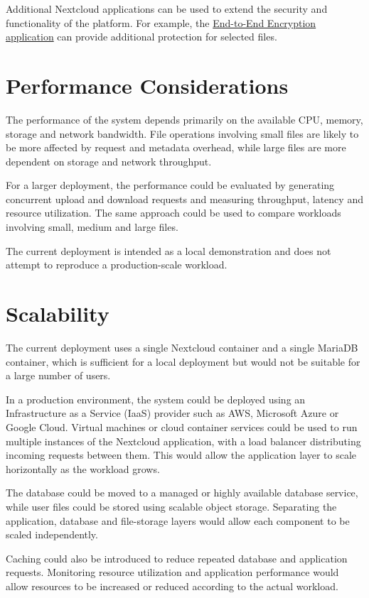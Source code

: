 \documentclass[a4paper]{article}
\begin{document}
Additional Nextcloud applications can be used to extend the security
and functionality of the platform. For example, the
\href{https://apps.nextcloud.com/apps/end_to_end_encryption}{End-to-End
Encryption application} can provide additional protection for
selected files.

\section{Performance Considerations}

The performance of the system depends primarily on the available CPU,
memory, storage and network bandwidth. File operations involving small
files are likely to be more affected by request and metadata overhead,
while large files are more dependent on storage and network throughput.

For a larger deployment, the performance could be evaluated by
generating concurrent upload and download requests and measuring
throughput, latency and resource utilization. The same approach could
be used to compare workloads involving small, medium and large files.

The current deployment is intended as a local demonstration and does
not attempt to reproduce a production-scale workload.

\section{Scalability}

The current deployment uses a single Nextcloud container and a single
MariaDB container, which is sufficient for a local deployment but would
not be suitable for a large number of users.

In a production environment, the system could be deployed using an
Infrastructure as a Service (IaaS) provider such as AWS, Microsoft
Azure or Google Cloud. Virtual machines or cloud container services
could be used to run multiple instances of the Nextcloud application,
with a load balancer distributing incoming requests between them. This
would allow the application layer to scale horizontally as the
workload grows.

The database could be moved to a managed or highly available database
service, while user files could be stored using scalable object
storage. Separating the application, database and file-storage layers
would allow each component to be scaled independently.

Caching could also be introduced to reduce repeated database and
application requests. Monitoring resource utilization and application
performance would allow resources to be increased or reduced according
to the actual workload.
\end{document}
